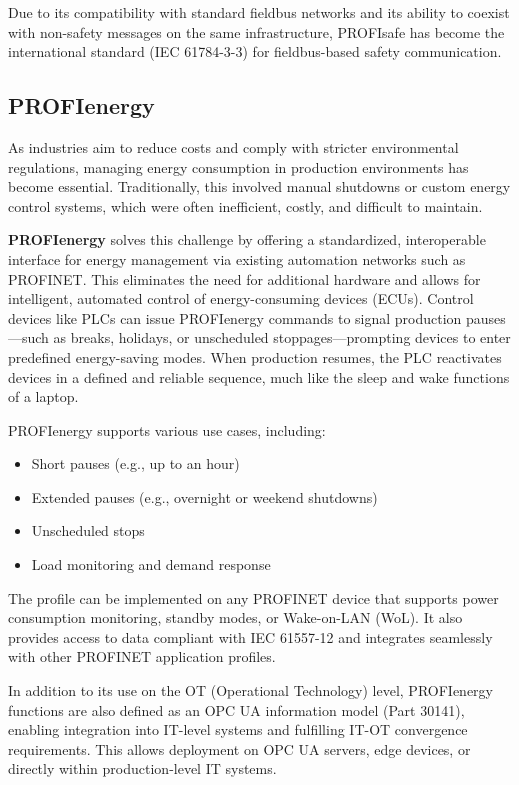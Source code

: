 \documentclass[conference]{IEEEtran}
\begin{document}
Due to its compatibility with standard fieldbus networks and its ability to coexist with non-safety messages on the same infrastructure, PROFIsafe has become the international standard (IEC 61784-3-3) for fieldbus-based safety communication.



\subsection{PROFIenergy}
\label{subsec: PROFIenergy}
As industries aim to reduce costs and comply with stricter environmental regulations, managing energy consumption in production environments has become essential. Traditionally, this involved manual shutdowns or custom energy control systems, which were often inefficient, costly, and difficult to maintain.

\textbf{PROFIenergy} solves this challenge by offering a standardized, interoperable interface for energy management via existing automation networks such as PROFINET. This eliminates the need for additional hardware and allows for intelligent, automated control of energy-consuming devices (ECUs). Control devices like PLCs can issue PROFIenergy commands to signal production pauses—such as breaks, holidays, or unscheduled stoppages—prompting devices to enter predefined energy-saving modes. When production resumes, the PLC reactivates devices in a defined and reliable sequence, much like the sleep and wake functions of a laptop.

PROFIenergy supports various use cases, including:
\begin{itemize}
    \item Short pauses (e.g., up to an hour)
    \item Extended pauses (e.g., overnight or weekend shutdowns)
    \item Unscheduled stops
    \item Load monitoring and demand response
\end{itemize}

The profile can be implemented on any PROFINET device that supports power consumption monitoring, standby modes, or Wake-on-LAN (WoL). It also provides access to data compliant with IEC 61557-12 and integrates seamlessly with other PROFINET application profiles.

In addition to its use on the OT (Operational Technology) level, PROFIenergy functions are also defined as an OPC UA information model (Part 30141), enabling integration into IT-level systems and fulfilling IT-OT convergence requirements. This allows deployment on OPC UA servers, edge devices, or directly within production-level IT systems.
\end{document}
